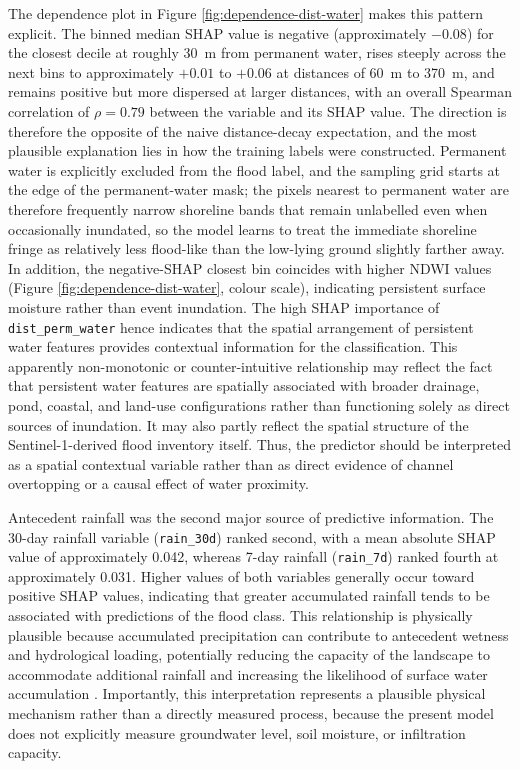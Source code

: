 \documentclass[11pt,twoside]{article}
\begin{document}
The dependence plot in Figure \ref{fig:dependence-dist-water} makes this
pattern explicit. The binned median SHAP value is negative (approximately
$-0.08$) for the closest decile at roughly 30~m from permanent water, rises
steeply across the next bins to approximately $+0.01$ to $+0.06$ at distances of
60~m to 370~m, and
remains positive but more dispersed at larger distances, with an overall
Spearman correlation of $\rho = 0.79$ between the variable and its SHAP value.
The direction is therefore the opposite of the naive distance-decay expectation,
and the most plausible explanation lies in how the training labels were
constructed. Permanent water is explicitly excluded from the flood label, and
the sampling grid starts at the edge of the permanent-water mask; the pixels
nearest to permanent water are therefore frequently narrow shoreline bands that
remain unlabelled even when occasionally inundated, so the model learns to
treat the immediate shoreline fringe as relatively less flood-like than the
low-lying ground slightly farther away. In addition, the negative-SHAP closest
bin coincides with higher NDWI values (Figure \ref{fig:dependence-dist-water},
colour scale), indicating persistent surface moisture rather than event
inundation. The high SHAP importance of \texttt{dist\_perm\_water} hence indicates that the spatial arrangement of persistent water features provides contextual information for the classification. This apparently non-monotonic or counter-intuitive relationship may reflect the fact that persistent water features are spatially associated with broader drainage, pond, coastal, and land-use configurations rather than functioning solely as direct sources of inundation. It may also partly reflect the spatial structure of the Sentinel-1-derived flood inventory itself. Thus, the predictor should be interpreted as a spatial contextual variable rather than as direct evidence of channel overtopping or a causal effect of water proximity.

Antecedent rainfall was the second major source of predictive information. The 30-day rainfall variable (\texttt{rain\_30d}) ranked second, with a mean absolute SHAP value of approximately 0.042, whereas 7-day rainfall (\texttt{rain\_7d}) ranked fourth at approximately 0.031. Higher values of both variables generally occur toward positive SHAP values, indicating that greater accumulated rainfall tends to be associated with predictions of the flood class. This relationship is physically plausible because accumulated precipitation can contribute to antecedent wetness and hydrological loading, potentially reducing the capacity of the landscape to accommodate additional rainfall and increasing the likelihood of surface water accumulation \cite{Zhao2025, Alcntara2025}. Importantly, this interpretation represents a plausible physical mechanism rather than a directly measured process, because the present model does not explicitly measure groundwater level, soil moisture, or infiltration capacity.
\end{document}
